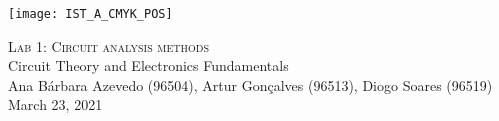 
\thispagestyle {empty}

\texttt{[image: IST\_A\_CMYK\_POS]}

\begin{center}
%
\vspace{1.0cm}

\vspace{3cm}
\textsc{\Huge Lab 1: Circuit analysis methods}\\
\vspace{0.5cm}
{\Large Circuit Theory and Electronics Fundamentals} \\
\vspace{0.8cm}
{\normalsize Ana Bárbara Azevedo (96504), Artur Gonçalves (96513), Diogo Soares (96519)} \\

\vspace{0.5cm}
{March 23, 2021}\\
\end{center}
\vspace{2.5cm}

